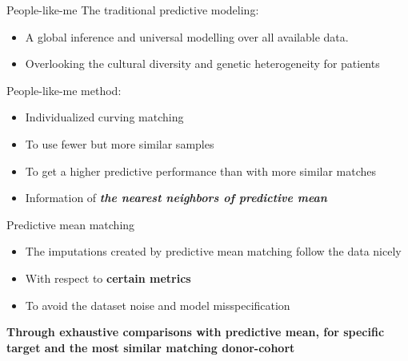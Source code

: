 \documentclass[
  8pt,
  ignorenonframetext,
]{beamer}
\providecommand{\tightlist}{%
  \setlength{\itemsep}{0pt}\setlength{\parskip}{0pt}}
\begin{document}
\begin{frame}{People-like-me}
\protect\hypertarget{people-like-me}{}
The traditional predictive modeling:

\begin{itemize}
\tightlist
\item
  A global inference and universal modelling over all available data.
\item
  Overlooking the cultural diversity and genetic heterogeneity for
  patients
\end{itemize}

People-like-me method:

\begin{itemize}
\tightlist
\item
  Individualized curving matching
\item
  To use fewer but more similar samples
\item
  To get a higher predictive performance than with more similar matches
\item
  Information of \textbf{\emph{the nearest neighbors of predictive
  mean}}
\end{itemize}
\end{frame}

\begin{frame}{Predictive mean matching}
\protect\hypertarget{predictive-mean-matching}{}
\begin{itemize}
\tightlist
\item
  The imputations created by predictive mean matching follow the data
  nicely
\item
  With respect to \textbf{certain metrics}
\item
  To avoid the dataset noise and model misspecification
\end{itemize}

\textbf{Through exhaustive comparisons with predictive mean, for
specific target and the most similar matching donor-cohort}
\end{frame}
\end{document}
